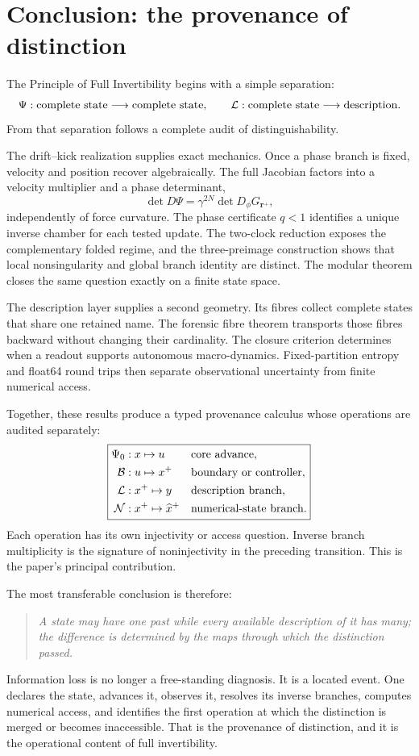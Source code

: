 \section{Conclusion: the provenance of distinction}
\label{sec:conclusion}

The Principle of Full Invertibility begins with a simple separation:
\[
\Psi:\text{complete state}\longrightarrow\text{complete state},
\qquad
\mathcal L:\text{complete state}\longrightarrow\text{description}.
\]
From that separation follows a complete audit of distinguishability.

The drift--kick realization supplies exact mechanics. Once a phase branch is fixed, velocity and position recover algebraically. The full Jacobian factors into a velocity multiplier and a phase determinant,
\[
\det D\Psi
=
\gamma^{2N}\det D_\phi G_{\bm r^+},
\]
independently of force curvature. The phase certificate \(q<1\) identifies a unique inverse chamber for each tested update. The two-clock reduction exposes the complementary folded regime, and the three-preimage construction shows that local nonsingularity and global branch identity are distinct. The modular theorem closes the same question exactly on a finite state space.

The description layer supplies a second geometry. Its fibres collect complete states that share one retained name. The forensic fibre theorem transports those fibres backward without changing their cardinality. The closure criterion determines when a readout supports autonomous macro-dynamics. Fixed-partition entropy and float64 round trips then separate observational uncertainty from finite numerical access.

Together, these results produce a typed provenance calculus whose operations are audited separately:
\[
\boxed{
\begin{aligned}
\Psi_0 &: x\mapsto u && \text{core advance},\\
\mathcal B &: u\mapsto x^+ && \text{boundary or controller},\\
\mathcal L &: x^+\mapsto y && \text{description branch},\\
\mathcal N &: x^+\mapsto\widehat{x}^{+} && \text{numerical-state branch}.
\end{aligned}
}
\]
Each operation has its own injectivity or access question. Inverse branch multiplicity is the
signature of noninjectivity in the preceding transition. This is the paper's
principal contribution.

The most transferable conclusion is therefore:
\begin{quote}
\large\itshape
A state may have one past while every available description of it has many; the difference is determined by the maps through which the distinction passed.
\end{quote}

Information loss is no longer a free-standing diagnosis. It is a located event. One declares the state, advances it, observes it, resolves its inverse branches, computes numerical access, and identifies the first operation at which the distinction is merged or becomes inaccessible. That is the provenance of distinction, and it is the operational content of full invertibility.
